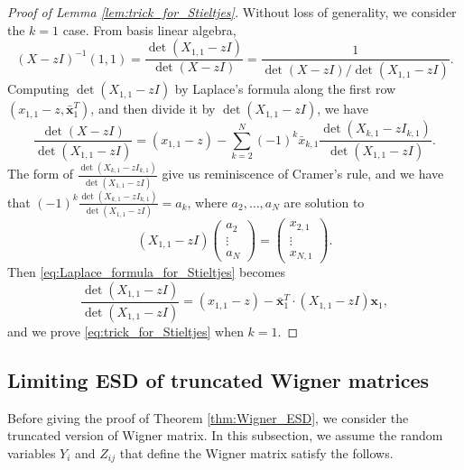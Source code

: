 \documentclass[11pt, a4paper]{article}
\numberwithin{equation}{section}
\renewcommand{\vec}[1]{\mathbf{#1}}
\theoremstyle{definition}
\theoremstyle{remark}
\begin{document}
\begin{proof}[Proof of Lemma \ref{lem:trick_for_Stieltjes}]
  Without loss of generality, we consider the $k = 1$ case. From basis linear algebra,
  \begin{equation}
    (X - zI)^{-1}(1, 1) = \frac{\det(X_{1, 1} - zI)}{\det(X - zI)} = \frac{1}{\det(X - zI) / \det(X_{1, 1} - zI)}.
  \end{equation}
  Computing $\det(X_{1, 1} - zI)$ by Laplace's formula along the first row $(x_{1, 1} - z, \bar{\vec{x}}^T_1)$, and then divide it by $\det(X_{1, 1} - zI)$, we have
  \begin{equation} \label{eq:Laplace_formula_for_Stieltjes}
    \frac{\det(X - zI)}{\det(X_{1, 1} - zI)} = (x_{1, 1} - z) - \sum^N_{k = 2} (-1)^k  \bar{x}_{k, 1} \frac{\det(X_{k, 1} - zI_{k, 1})}{\det(X_{1, 1} - zI)}.
  \end{equation}
  The form of $\frac{\det(X_{k, 1} - zI_{k, 1})}{\det(X_{1, 1} - zI)}$ give us reminiscence of Cramer's rule, and we have that $(-1)^k \frac{\det(X_{k, 1} - zI_{k, 1})}{\det(X_{1, 1} - zI)} = a_k$, where $a_2, \dotsc, a_N$ are solution to
  \begin{equation}
    (X_{1, 1} - zI)
    \begin{pmatrix}
      a_2 \\
      \vdots \\
      a_N
    \end{pmatrix}
    =
    \begin{pmatrix}
      x_{2, 1} \\
      \vdots \\
      x_{N, 1}
    \end{pmatrix}.
  \end{equation}
  Then \eqref{eq:Laplace_formula_for_Stieltjes} becomes
  \begin{equation}
    \frac{\det(X_{1, 1} - zI)}{\det(X_{1, 1} - zI)} = (x_{1, 1} - z) - \bar{\vec{x}}^T_1 \cdot (X_{1, 1} - zI) \vec{x}_1,
  \end{equation}
  and we prove \eqref{eq:trick_for_Stieltjes} when $k = 1$.
\end{proof}

\subsection{Limiting ESD of truncated Wigner matrices}

Before giving the proof of Theorem \ref{thm:Wigner_ESD}, we consider the truncated version of Wigner matrix. In this subsection, we assume the random variables $Y_i$ and $Z_{ij}$ that define the Wigner matrix satisfy the follows.
\end{document}
